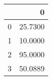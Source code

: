 \begin{tabular}{lr}
\toprule
{} &        0 \\
\midrule
0 &  25.7300 \\
1 &  10.0000 \\
2 &  95.0000 \\
3 &  50.0889 \\
\bottomrule
\end{tabular}
